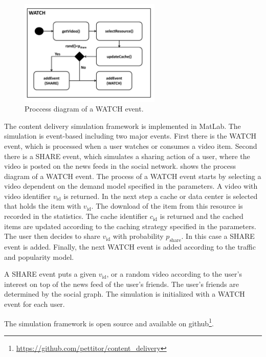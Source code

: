 \begin{figure}[bt]
  \centering
  \includegraphics[width=0.6\textwidth]{hierarchical/simulative/figures/watch}
  \caption{Proccess diagram of a WATCH event.}
  \label{fig:WATCH}
\end{figure}

The content delivery simulation framework is implemented in MatLab.
The simulation is event-based including two major events.
First there is the WATCH event, which is processed when a user watches or consumes a video item.
Second there is a SHARE event, which simulates a sharing action of a user, where the video is posted on the news feeds in the social network.
 shows the process diagram of a WATCH event.
The process of a WATCH event starts by selecting a video dependent on the demand model specified in the parameters.
A video with video identifier $v_\text{id}$ is returned.
In the next step a cache or data center is selected that holds the item with $v_\text{id}$.
The download of the item from this resource is recorded in the statistics.
The cache identifier $c_\text{id}$ is returned and the cached items are updated according to the caching strategy specified in the parameters.
The user then decides to share $v_\text{id}$ with probability $p_\text{share}$.
In this case a SHARE event is added.
Finally, the next WATCH event is added according to the traffic and popularity model.

A SHARE event puts a given $v_\text{id}$, or a random video according to the user's interest on top of the news feed of the user's friends.
The user's friends are determined by the social graph.
The simulation is initialized with a WATCH event for each user.

The simulation framework is open source and available on github\footnote{\url{https://github.com/pettitor/content_delivery}}.
